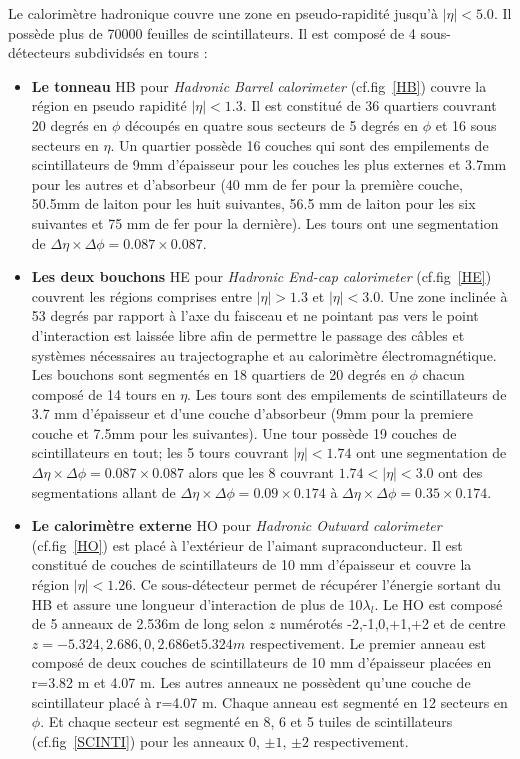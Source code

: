 Le calorimètre hadronique couvre une zone en pseudo-rapidité jusqu'à $|\eta|<5.0$. Il possède plus de 70000 feuilles de scintillateurs. Il est composé de 4 sous-détecteurs subdividsés en tours : 
\begin{itemize}[label=$\bullet$]
	\item \textbf{Le tonneau} HB pour \textit{Hadronic Barrel calorimeter} (cf.fig~\ref{HB}) couvre la région en pseudo rapidité $|\eta|<1.3$. Il est constitué de 36 quartiers couvrant 20 degrés en $\phi$ découpés en quatre sous secteurs de 5 degrés en $\phi$ et 16 sous secteurs en $\eta$. Un quartier possède 16 couches qui sont des empilements de scintillateurs de 9mm d'épaisseur pour les couches les plus externes et 3.7mm pour les autres et d'absorbeur (40 mm de fer pour la première couche, 50.5mm de laiton pour les huit suivantes, 56.5 mm de laiton pour les six suivantes et 75 mm de fer pour la dernière). Les tours ont une segmentation de $\Delta\eta\times\Delta\phi=0.087\times0.087$.
	\item \textbf{Les deux bouchons} HE pour \textit{Hadronic End-cap calorimeter} (cf.fig~\ref{HE}) couvrent les régions comprises entre $|\eta|>1.3$ et $|\eta|<3.0$. Une zone inclinée à 53 degrés par rapport à l'axe du faisceau et ne pointant pas vers le point d'interaction est laissée libre afin de permettre le passage des câbles et systèmes nécessaires au trajectographe et au calorimètre électromagnétique. Les bouchons sont segmentés en 18 quartiers de 20 degrés en $\phi$ chacun composé de 14 tours en $\eta$. Les tours sont des empilements de scintillateurs de 3.7 mm d'épaisseur et d'une couche d'absorbeur (9mm pour la premiere couche et 7.5mm pour les suivantes). Une tour possède 19 couches de  scintillateurs en tout; les 5 tours couvrant $|\eta|<1.74$ ont une segmentation de $\Delta\eta\times\Delta\phi=0.087\times0.087$ alors que les 8 couvrant $1.74<|\eta|<3.0$ ont des segmentations allant de $\Delta\eta\times\Delta\phi=0.09\times0.174$ à $\Delta\eta\times\Delta\phi=0.35\times0.174$.
	\item \textbf{Le calorimètre externe} HO pour \textit{Hadronic Outward calorimeter} (cf.fig~\ref{HO}) est placé à l'extérieur de l'aimant supraconducteur. Il est constitué de couches de scintillateurs de 10 mm d'épaisseur et couvre la région $|\eta|<1.26$. Ce sous-détecteur permet de récupérer l'énergie sortant du HB et assure une longueur d'interaction de plus de 10$\lambda_{l}$. Le HO est composé de 5 anneaux de 2.536m de long selon $z$ 
	numérotés -2,-1,0,+1,+2 et de centre $z=-5.324, 2.686, 0, 2.686 $et$ 5.324m$ respectivement. Le premier anneau est composé de deux couches de scintillateurs de 10 mm d'épaisseur placées en r=3.82 m et 4.07 m. Les autres anneaux ne possèdent qu'une couche de scintillateur placé à r=4.07 m. Chaque anneau est segmenté en 12 secteurs en $\phi$. Et chaque secteur est segmenté en 8, 6 et 5 tuiles de scintillateurs (cf.fig~\ref{SCINTI}) pour les anneaux 0, $\pm1$, $\pm2$ respectivement.

\end{itemize}
